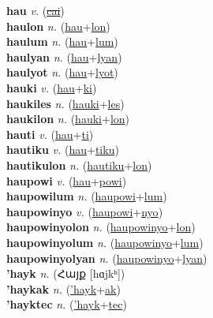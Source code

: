 \textbf{hau} \textit{v.} (\hyperref[cai]{\sout{cai}})
 \label{hau} \\
\textbf{haulon} \textit{n.} (\hyperref[hau]{hau}+\hyperref[lon]{lon})
 \label{haulon} \\
\textbf{haulum} \textit{n.} (\hyperref[hau]{hau}+\hyperref[lum]{lum})
 \label{haulum} \\
\textbf{haulyan} \textit{n.} (\hyperref[hau]{hau}+\hyperref[lyan]{lyan})
 \label{haulyan} \\
\textbf{haulyot} \textit{n.} (\hyperref[hau]{hau}+\hyperref[lyot]{lyot})
 \label{haulyot} \\
\textbf{hauki} \textit{v.} (\hyperref[hau]{hau}+\hyperref[ki]{ki})
 \label{hauki} \\
\textbf{haukiles} \textit{n.} (\hyperref[hauki]{hauki}+\hyperref[les]{les})
 \label{haukiles} \\
\textbf{haukilon} \textit{n.} (\hyperref[hauki]{hauki}+\hyperref[lon]{lon})
 \label{haukilon} \\
\textbf{hauti} \textit{v.} (\hyperref[hau]{hau}+\hyperref[ti]{ti})
 \label{hauti} \\
\textbf{hautiku} \textit{v.} (\hyperref[hau]{hau}+\hyperref[tiku]{tiku})
 \label{hautiku} \\
\textbf{hautikulon} \textit{n.} (\hyperref[hautiku]{hautiku}+\hyperref[lon]{lon})
 \label{hautikulon} \\
\textbf{haupowi} \textit{v.} (\hyperref[hau]{hau}+\hyperref[powi]{powi})
 \label{haupowi} \\
\textbf{haupowilum} \textit{n.} (\hyperref[haupowi]{haupowi}+\hyperref[lum]{lum})
 \label{haupowilum} \\
\textbf{haupowinyo} \textit{v.} (\hyperref[haupowi]{haupowi}+\hyperref[nyo]{nyo})
 \label{haupowinyo} \\
\textbf{haupowinyolon} \textit{n.} (\hyperref[haupowinyo]{haupowinyo}+\hyperref[lon]{lon})
 \label{haupowinyolon} \\
\textbf{haupowinyolum} \textit{n.} (\hyperref[haupowinyo]{haupowinyo}+\hyperref[lum]{lum})
 \label{haupowinyolum} \\
\textbf{haupowinyolyan} \textit{n.} (\hyperref[haupowinyo]{haupowinyo}+\hyperref[lyan]{lyan})
 \label{haupowinyolyan} \\
\textbf{'hayk} \textit{n.} ({\armenian{}Հայք} [hɑjkʰ])
 \label{'hayk} \\
\textbf{'haykak} \textit{n.} (\hyperref['hayk]{'hayk}+\hyperref[ak]{ak})
 \label{'haykak} \\
\textbf{'hayktec} \textit{n.} (\hyperref['hayk]{'hayk}+\hyperref[tec]{tec})
